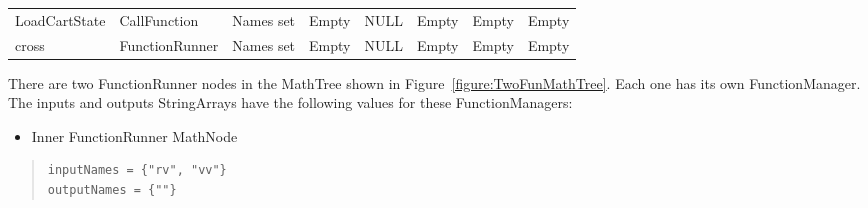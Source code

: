 \begin{center}
\begin{small}
\tablelasttail{\hline}
\begin{supertabular}{|l|l|m{0.56in}|m{0.55in}|m{0.55in}|m{0.55in}|m{0.55in}|m{0.55in}|}
LoadCartState & CallFunction & Names set & Empty & NULL & Empty & Empty & Empty\\
cross & Function\-Runner & Names set & Empty & NULL & Empty & Empty & Empty\\
\end{supertabular}
\end{small}
\end{center}

There are two FunctionRunner nodes in the MathTree shown in Figure~\ref{figure:TwoFunMathTree}. 
Each one has its own FunctionManager.  The inputs and outputs StringArrays have the following values
for these FunctionManagers:

\begin{itemize}
\item Inner FunctionRunner MathNode
\end{itemize}

\begin{quote}
\begin{verbatim}
inputNames = {"rv", "vv"}
outputNames = {""}
\end{verbatim}
\end{quote}

